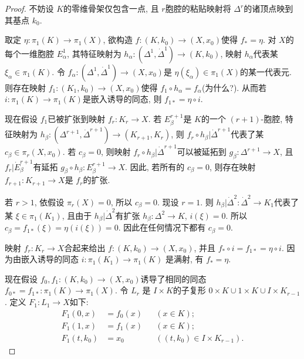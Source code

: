 \documentclass{ctexart}
\theoremstyle{plain}
\theoremstyle{definition}
\begin{document}
        \begin{proof}
            不妨设 $K$的零维骨架仅包含一点, 且 $r$胞腔的粘贴映射将 $\Delta^{r}$的诸顶点映到其基点 $k_0$.

            取定 $\eta:\pi_1(K)\to \pi_1(X)$, 欲构造 $f:(K,k_0)\to (X,x_0)$使得 $f_*=\eta$. 对 $X$的每个一维胞腔 $E^{1}_{\alpha}$, 其特征映射为 $h_{\alpha}:(\Delta^{1},\dot{\Delta}^{1})\to (K,k_0)$, 映射 $h_{\alpha}$代表某 $\xi_{\alpha}\in \pi_1(K)$. 令 $f_{\alpha}:(\Delta^{1},\dot{\Delta}^{1})\to (X,x_0)$是 $\eta(\xi_{\alpha})\in \pi_1(X)$的某一代表元. 则存在映射 $f_1:(K_1,k_0)\to (X,x_0)$使得 $f_1\circ h_{\alpha}=f_{\alpha}$(为什么?). 从而若 $i:\pi_1(K)\to \pi_1(K)$是嵌入诱导的同态, 则 $f_{1*}=\eta\circ i$.

            现在假设 $f_1$已被扩张到映射 $f_{r}:K_{r}\to X$. 若 $E^{r+1}_{\beta}$是 $K$的一个 $(r+1)$-胞腔, 特征映射为 $h_{\beta}:(\Delta^{r+1},\dot{\Delta}^{r+1})\to (K_{r+1},K_{r})$, 则 $f_{r}\circ h_{\beta}|\dot{\Delta}^{r+1}$代表了某 $c_{\beta}\in \pi_{r}(X,x_0)$. 若 $c_{\beta}=0$, 则映射 $f_{r}\circ h_{\beta}|\dot{\Delta}^{r+1}$可以被延拓到 $g_{\beta}:\Delta^{r+1}\to X$, 且 $f_{r}|\dot{E}^{r+1}_{\beta}$有延拓 $g_{\beta}\circ h_{\beta}:E_{\beta}^{r+1}\to X$. 因此, 若所有的 $c_{\beta}=0$, 则存在映射 $f_{r+1}:K_{r+1}\to X$是 $f_{r}$的扩张.

            若 $r>1$, 依假设 $\pi_{r}(X)=0$, 所以 $c_{\beta}=0$. 现设 $r=1$. 则 $h_{\beta}|\dot{\Delta}^{2}:\dot{\Delta}^{2}\to K_1$代表了某 $\xi \in \pi_{1}(K_1)$, 且由于 $h_{\beta}|\dot{\Delta}^{2}$有扩张 $h_{\beta}:\Delta^{2}\to K$, $i(\xi)=0$. 所以 $c_{\beta}=f_{1*}(\xi)=\eta(i(\xi))=0$. 因此在任何情况下都有 $c_{\beta}=0$.

            映射 $f_{r}:K_{r}\to X$合起来给出 $f:(K,k_0)\to (X,x_0)$, 并且 $f_{*}\circ i= f_{1*}=\eta\circ i$. 因为由嵌入诱导的同态 $i:\pi_1(K_1)\to \pi_1(K)$ 是满射, 有 $f_{*}=\eta$.

            现在假设 $f_0, f_1:(K,k_0)\to (X,x_0)$诱导了相同的同态 $f_{0*}=f_{1*}:\pi_{1}(K)\to \pi_1(X)$. 令 $L_{r}$ 是 $I\times K$的子复形  $0\times K \cup 1\times K \cup I\times K_{r-1}$. 定义 $F_{1}:L_{1}\to X$如下:
            \begin{align*}
                F_1(0, x) &= f_0(x) && (x \in K); \\
                F_1(1, x) &= f_1(x) && (x \in K); \\
                F_1(t, k_0) &= x_0 && ((t, k_0) \in I \times K_{r-1}).
            \end{align*}
            

\end{proof}
\end{document}
